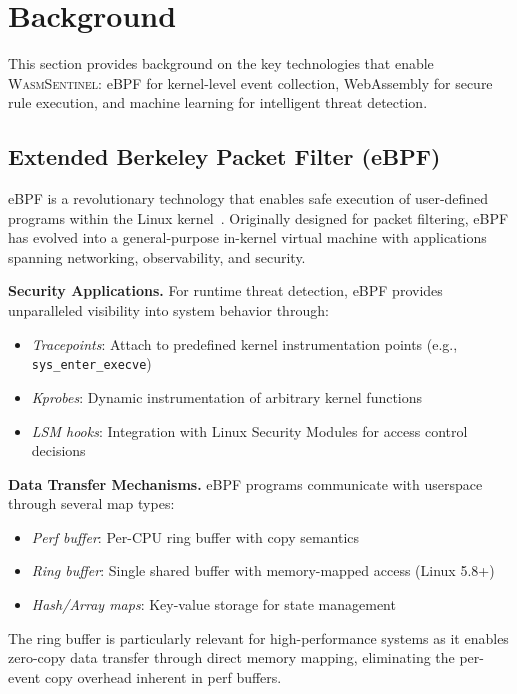 
\section{Background}
\label{sec:background}

This section provides background on the key technologies that enable \textsc{WasmSentinel}: eBPF for kernel-level event collection, WebAssembly for secure rule execution, and machine learning for intelligent threat detection.

\subsection{Extended Berkeley Packet Filter (eBPF)}
\label{sec:bg-ebpf}

eBPF is a revolutionary technology that enables safe execution of user-defined programs within the Linux kernel~\cite{ebpf-intro}.
Originally designed for packet filtering, eBPF has evolved into a general-purpose in-kernel virtual machine with applications spanning networking, observability, and security.

\textbf{Security Applications.}
For runtime threat detection, eBPF provides unparalleled visibility into system behavior through:
\begin{itemize}
    \item \textit{Tracepoints}: Attach to predefined kernel instrumentation points (e.g., \texttt{sys\_enter\_execve})
    \item \textit{Kprobes}: Dynamic instrumentation of arbitrary kernel functions
    \item \textit{LSM hooks}: Integration with Linux Security Modules for access control decisions
\end{itemize}

\textbf{Data Transfer Mechanisms.}
eBPF programs communicate with userspace through several map types:
\begin{itemize}
    \item \textit{Perf buffer}: Per-CPU ring buffer with copy semantics
    \item \textit{Ring buffer}: Single shared buffer with memory-mapped access (Linux 5.8+)
    \item \textit{Hash/Array maps}: Key-value storage for state management
\end{itemize}

The ring buffer is particularly relevant for high-performance systems as it enables zero-copy data transfer through direct memory mapping, eliminating the per-event copy overhead inherent in perf buffers.

